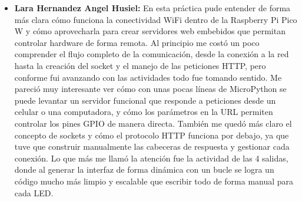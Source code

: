 \documentclass[letterpaper,12pt]{article}
\begin{document}
\begin{itemize}
        Al trabajar con las diferentes actividades pude observar cómo cada petición del cliente es analizada por el servidor para ejecutar acciones específicas sobre el hardware, como encender LEDs, ajustar el volumen del zumbador mediante PWM o cambiar el color del RGB a través del expansor PCF8574. Me pareció muy interesante ver cómo el servidor también puede leer el estado de entradas digitales (como los botones S1 y S2) y mostrarlas en tiempo real en la interfaz web, lo que permite una interacción bidireccional completa entre el usuario y la Pico W. También me quedó claro el concepto de generación dinámica de HTML, donde los estados actuales de los dispositivos se insertan directamente en la página antes de enviarla al cliente, evitando tener que hacer múltiples peticiones al servidor.

        \item \textbf{Lara Hernandez Angel Husiel:} En esta práctica pude entender de forma más clara cómo funciona la conectividad WiFi dentro de la Raspberry Pi Pico W y cómo aprovecharla para crear servidores web embebidos que permitan controlar hardware de forma remota. Al principio me costó un poco comprender el flujo completo de la comunicación, desde la conexión a la red hasta la creación del socket y el manejo de las peticiones HTTP, pero conforme fui avanzando con las actividades todo fue tomando sentido. Me pareció muy interesante ver cómo con unas pocas líneas de MicroPython se puede levantar un servidor funcional que responde a peticiones desde un celular o una computadora, y cómo los parámetros en la URL permiten controlar los pines GPIO de manera directa. También me quedó más claro el concepto de sockets y cómo el protocolo HTTP funciona por debajo, ya que tuve que construir manualmente las cabeceras de respuesta y gestionar cada conexión. Lo que más me llamó la atención fue la actividad de las 4 salidas, donde al generar la interfaz de forma dinámica con un bucle se logra un código mucho más limpio y escalable que escribir todo de forma manual para cada LED.

    \end{itemize}

    \newpage


    \nocite{*} 
    \printbibliography[heading=bibintoc, title={Referencias}]
\end{document}
